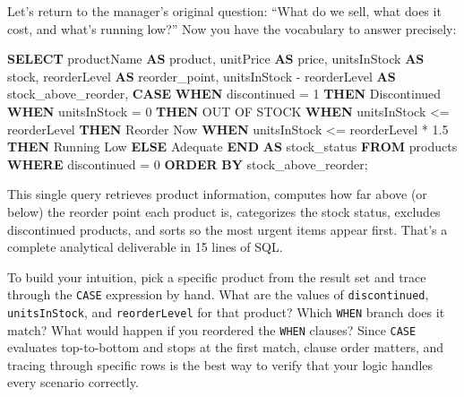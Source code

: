 \documentclass[
  letterpaper,
  DIV=11,
  numbers=noendperiod]{scrreprt}
\newenvironment{Shaded}{\begin{snugshade}}{\end{snugshade}}
\newcommand{\ControlFlowTok}[1]{\textcolor[rgb]{0.00,0.23,0.31}{\textbf{#1}}}
\newcommand{\DecValTok}[1]{\textcolor[rgb]{0.68,0.00,0.00}{#1}}
\newcommand{\FloatTok}[1]{\textcolor[rgb]{0.68,0.00,0.00}{#1}}
\newcommand{\KeywordTok}[1]{\textcolor[rgb]{0.00,0.23,0.31}{\textbf{#1}}}
\newcommand{\NormalTok}[1]{\textcolor[rgb]{0.00,0.23,0.31}{#1}}
\newcommand{\OperatorTok}[1]{\textcolor[rgb]{0.37,0.37,0.37}{#1}}
\newcommand{\StringTok}[1]{\textcolor[rgb]{0.13,0.47,0.30}{#1}}
\begin{document}
Let's return to the manager's original question: ``What do we sell, what
does it cost, and what's running low?'' Now you have the vocabulary to
answer precisely:

\begin{codelisting}

\caption{\texttt{duckdb}}

\begin{Shaded}
\begin{Highlighting}[]
\KeywordTok{SELECT}
\NormalTok{    productName }\KeywordTok{AS}\NormalTok{ product,}
\NormalTok{    unitPrice }\KeywordTok{AS}\NormalTok{ price,}
\NormalTok{    unitsInStock }\KeywordTok{AS}\NormalTok{ stock,}
\NormalTok{    reorderLevel }\KeywordTok{AS}\NormalTok{ reorder\_point,}
\NormalTok{    unitsInStock }\OperatorTok{{-}}\NormalTok{ reorderLevel }\KeywordTok{AS}\NormalTok{ stock\_above\_reorder,}
    \ControlFlowTok{CASE}
        \ControlFlowTok{WHEN}\NormalTok{ discontinued }\OperatorTok{=} \DecValTok{1} \ControlFlowTok{THEN} \StringTok{\textquotesingle{}Discontinued\textquotesingle{}}
        \ControlFlowTok{WHEN}\NormalTok{ unitsInStock }\OperatorTok{=} \DecValTok{0} \ControlFlowTok{THEN} \StringTok{\textquotesingle{}OUT OF STOCK\textquotesingle{}}
        \ControlFlowTok{WHEN}\NormalTok{ unitsInStock }\OperatorTok{\textless{}=}\NormalTok{ reorderLevel }\ControlFlowTok{THEN} \StringTok{\textquotesingle{}Reorder Now\textquotesingle{}}
        \ControlFlowTok{WHEN}\NormalTok{ unitsInStock }\OperatorTok{\textless{}=}\NormalTok{ reorderLevel }\OperatorTok{*} \FloatTok{1.5} \ControlFlowTok{THEN} \StringTok{\textquotesingle{}Running Low\textquotesingle{}}
        \ControlFlowTok{ELSE} \StringTok{\textquotesingle{}Adequate\textquotesingle{}}
    \ControlFlowTok{END} \KeywordTok{AS}\NormalTok{ stock\_status}
\KeywordTok{FROM}\NormalTok{ products}
\KeywordTok{WHERE}\NormalTok{ discontinued }\OperatorTok{=} \DecValTok{0}
\KeywordTok{ORDER} \KeywordTok{BY}\NormalTok{ stock\_above\_reorder;}
\end{Highlighting}
\end{Shaded}

\end{codelisting}

This single query retrieves product information, computes how far above
(or below) the reorder point each product is, categorizes the stock
status, excludes discontinued products, and sorts so the most urgent
items appear first. That's a complete analytical deliverable in 15 lines
of SQL.

To build your intuition, pick a specific product from the result set and
trace through the \texttt{CASE} expression by hand. What are the values
of \texttt{discontinued}, \texttt{unitsInStock}, and
\texttt{reorderLevel} for that product? Which \texttt{WHEN} branch does
it match? What would happen if you reordered the \texttt{WHEN} clauses?
Since \texttt{CASE} evaluates top-to-bottom and stops at the first
match, clause order matters, and tracing through specific rows is the
best way to verify that your logic handles every scenario correctly.
\end{document}
